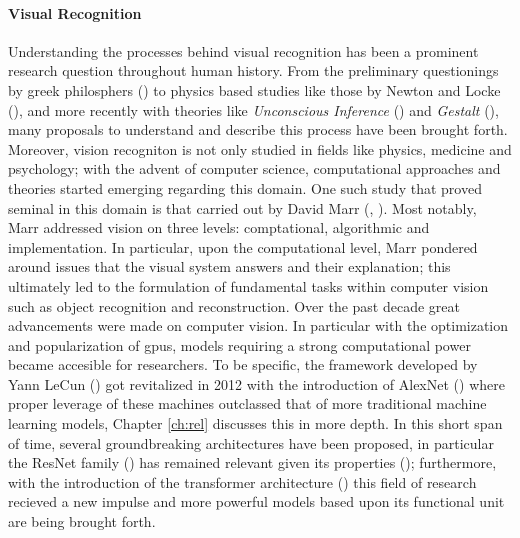 \paragraph{Visual Recognition} Understanding the processes behind visual recognition has been a 
prominent research question throughout human history. From the preliminary questionings by greek  
philosphers (\cite{finger2001origins}) to physics based studies like those by Newton and Locke 
(\cite{swenson2010optics}), and more recently with theories like \textit{Unconscious Inference} 
(\cite{gullstrand1909hemholtz}) and \textit{Gestalt} (\cite{wagemans2012century}), many proposals 
to understand and describe this process have been brought forth. Moreover, vision recogniton is not 
only studied in fields like physics, medicine and psychology; 
with the advent of computer science, computational approaches and theories started emerging 
regarding this domain. One such study that proved seminal in this domain is that carried out by 
David Marr (\cite{poggio1981marr}, \cite{marr2010vision}). Most notably, Marr addressed vision on 
three levels: comptational, algorithmic and implementation. In particular, upon the computational 
level, Marr pondered around issues that the visual system answers and their explanation; this 
ultimately led to the formulation of fundamental tasks within computer vision such as object 
recognition and reconstruction. Over the past decade great advancements were made on computer 
vision. In particular with the optimization and popularization of \glspl{gpu}, models requiring 
a strong computational power became accesible for researchers. To be specific, the framework 
developed by Yann LeCun (\cite{lecun1998gradient}) got revitalized in 2012 with the introduction of 
AlexNet (\cite{krizhevsky2012imagenet}) where proper leverage of these machines outclassed that of 
more traditional machine learning models, Chapter \ref{ch:rel} discusses this in more depth. 
In this short span of time, several groundbreaking architectures have been proposed, in 
particular the ResNet family (\cite{he2016deep}) has remained relevant given its properties
(\cite{wightman2021resnet}); furthermore, with the introduction of the transformer architecture 
(\cite{vaswani2017attention}) this field of research recieved a new impulse and more powerful 
models based upon its functional unit are being brought forth.\\

